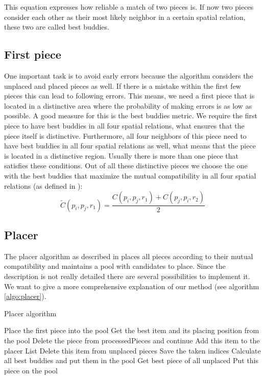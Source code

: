 \documentclass[]{report}
\begin{document}
This equation expresses how reliable a match of two pieces is. If now two pieces consider each other as their most likely neighbor in a certain spatial relation, these two are called best buddies.

\subsection{First piece}
One important task is to avoid early errors because the algorithm considers the unplaced and placed pieces as well. If there is a mistake within the first few pieces this can lead to following errors.
This means, we need a first piece that is located in a distinctive area where the probability of making errors is as low as possible. A good measure for this is the best buddies metric. We require the first piece to have best buddies in all four spatial relations, what ensures that the piece itself is distinctive. Furthermore, all four neighbors of this piece need to have best buddies in all four spatial relations as well, what means that the piece is located in a distinctive region. 
Usually there is more than one piece that satisfies these conditions. Out of all these distinctive pieces we choose the one with the best buddies that maximize the mutual compatibility in all four spatial relations (as defined in \cite{Paikin2015}):
\begin{equation}\label{eq:mutualComp}
\widetilde{C}(p_i,p_j,r_1) = \frac{C(p_i,p_j,r_1)+C(p_j,p_i,r_2)}{2}
\end{equation}

\subsection{Placer}
The placer algorithm as described in \cite{Paikin2015} places all pieces according to their mutual compatibility and maintains a pool with candidates to place. Since the description is not really detailed there are several possibilities to implement it. We want to give a more comprehensive explanation of our method (see algorithm \ref{algo:placer}).

\begin{algorithm}
	\caption{Placer algorithm}
	\label{algo:placer}
	\begin{algorithmic}
		\State Place the first piece into the pool
				\State Get the best item and its placing position from the pool
					\State Delete the piece from processedPieces and continue \EndIf
				\State Add this item to the placer List
				\State Delete this item from unplaced pieces
				\State Save the taken indices
				\State Calculate all best buddies and put them in the pool
			\EndWhile
		\State Get best piece of all unplaced
			\State Put this piece on the pool
		\EndIf
		\EndWhile
	\end{algorithmic}
\end{algorithm}
\end{document}
